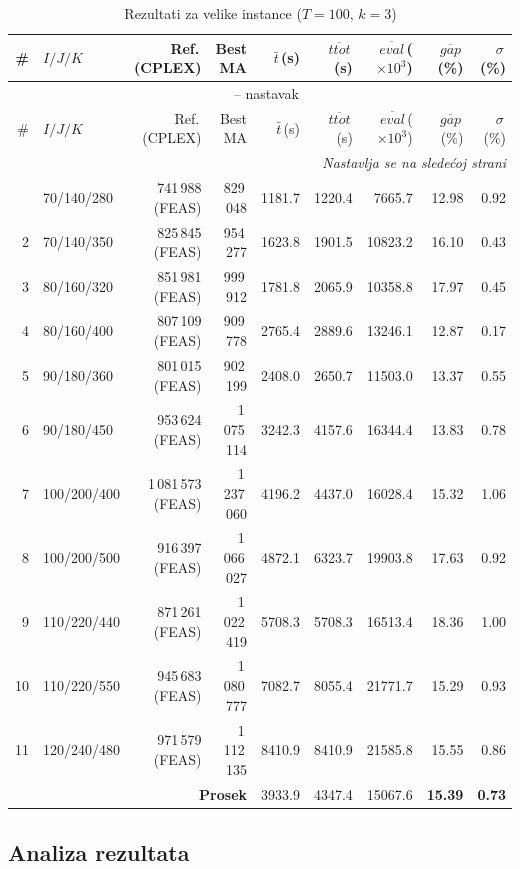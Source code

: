 \documentclass[12pt,a4paper]{article}
\begin{document}
\begin{longtable}{r l r r r r r r r}
\caption{Rezultati za velike instance ($T=100$, $k=3$)} \\
\toprule
\# & $I/J/K$ & Ref.\,(CPLEX) & Best MA & $\bar t$\,(s) & $\overline{ttot}$\,(s) & $\overline{eval}$\,($\times 10^3$) & $\overline{gap}$\,(\%) & $\sigma$\,(\%) \\
\midrule
\endfirsthead
\multicolumn{9}{c}{\tablename\ \thetable{} -- nastavak} \\
\toprule
\# & $I/J/K$ & Ref.\,(CPLEX) & Best MA & $\bar t$\,(s) & $\overline{ttot}$\,(s) & $\overline{eval}$\,($\times 10^3$) & $\overline{gap}$\,(\%) & $\sigma$\,(\%) \\
\midrule
\endhead
\midrule
\multicolumn{9}{r}{\textit{Nastavlja se na sledećoj strani}} \\
\endfoot
\bottomrule
\endlastfoot
1 & 70/140/280 & 741\,988 (FEAS) & 829\,048 & 1181.7 & 1220.4 & 7665.7 & 12.98 & 0.92 \\
2 & 70/140/350 & 825\,845 (FEAS) & 954\,277 & 1623.8 & 1901.5 & 10823.2 & 16.10 & 0.43 \\
3 & 80/160/320 & 851\,981 (FEAS) & 999\,912 & 1781.8 & 2065.9 & 10358.8 & 17.97 & 0.45 \\
4 & 80/160/400 & 807\,109 (FEAS) & 909\,778 & 2765.4 & 2889.6 & 13246.1 & 12.87 & 0.17 \\
5 & 90/180/360 & 801\,015 (FEAS) & 902\,199 & 2408.0 & 2650.7 & 11503.0 & 13.37 & 0.55 \\
6 & 90/180/450 & 953\,624 (FEAS) & 1\,075\,114 & 3242.3 & 4157.6 & 16344.4 & 13.83 & 0.78 \\
7 & 100/200/400 & 1\,081\,573 (FEAS) & 1\,237\,060 & 4196.2 & 4437.0 & 16028.4 & 15.32 & 1.06 \\
8 & 100/200/500 & 916\,397 (FEAS) & 1\,066\,027 & 4872.1 & 6323.7 & 19903.8 & 17.63 & 0.92 \\
9 & 110/220/440 & 871\,261 (FEAS) & 1\,022\,419 & 5708.3 & 5708.3 & 16513.4 & 18.36 & 1.00 \\
10 & 110/220/550 & 945\,683 (FEAS) & 1\,080\,777 & 7082.7 & 8055.4 & 21771.7 & 15.29 & 0.93 \\
11 & 120/240/480 & 971\,579 (FEAS) & 1\,112\,135 & 8410.9 & 8410.9 & 21585.8 & 15.55 & 0.86 \\
\midrule
\multicolumn{4}{r}{\textbf{Prosek}} & 3933.9 & 4347.4 & 15067.6 & \textbf{15.39} & \textbf{0.73} \\
\end{longtable}

\subsection{Analiza rezultata}
\end{document}
